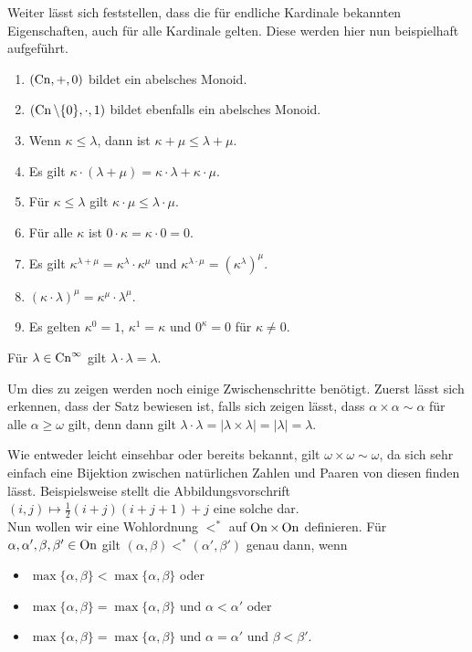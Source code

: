 Weiter lässt sich feststellen, dass die für endliche Kardinale bekannten Eigenschaften, auch für alle Kardinale gelten. Diese werden hier nun beispielhaft aufgeführt.

\begin{enumerate}
	\item $(\operatorname{Cn},+,0)$ bildet ein abelsches Monoid.
	\item $(\operatorname{Cn}\setminus \{0\},\cdot, 1)$ bildet ebenfalls ein abelsches Monoid.
	\item Wenn $\kappa\leq\lambda$, dann ist $\kappa+\mu \leq \lambda+\mu$.
	\item Es gilt $\kappa\cdot(\lambda+\mu)=\kappa\cdot\lambda + \kappa\cdot\mu$.
	\item Für $\kappa\leq\lambda$ gilt $\kappa\cdot\mu \leq \lambda\cdot \mu$.
	\item Für alle $\kappa$ ist $0\cdot\kappa=\kappa\cdot 0=0$.
	\item Es gilt $\kappa^{\lambda+\mu}=\kappa^\lambda\cdot\kappa^\mu$ und $\kappa^{\lambda\cdot\mu}=(\kappa^\lambda)^\mu$.
	\item $(\kappa\cdot\lambda)^\mu=\kappa^\mu\cdot\lambda^\mu$.
	\item Es gelten $\kappa^0=1$, $\kappa^1=\kappa$ und $0^\kappa=0$ für $\kappa\neq0$.
\end{enumerate}

\begin{satz}[Hessenberg, 1906]
	Für $\lambda\in \operatorname{Cn}^\infty$ gilt $\lambda\cdot\lambda=\lambda$.
\end{satz}
Um dies zu zeigen werden noch einige Zwischenschritte benötigt. Zuerst lässt sich erkennen, dass der Satz bewiesen ist, falls sich zeigen lässt, dass $\alpha\times\alpha\sim \alpha$ für alle $\alpha\geq\omega$ gilt, denn dann gilt $\lambda\cdot\lambda=\vert\lambda\times\lambda\vert=\vert\lambda\vert=\lambda$.

Wie entweder leicht einsehbar oder bereits bekannt, gilt $\omega\times\omega\sim\omega$, da sich sehr einfach eine Bijektion zwischen natürlichen Zahlen und Paaren von diesen finden lässt. Beispielsweise stellt die Abbildungsvorschrift $(i,j)\mapsto\frac{1}{2}(i+j)(i+j+1)+j$ eine solche dar.
\\

Nun wollen wir eine Wohlordnung $<^\ast$ auf $\operatorname{On}\times \operatorname{On}$ definieren. Für $\alpha,\alpha',\beta,\beta'\in \operatorname{On}$ gilt $(\alpha,\beta)<^\ast(\alpha',\beta')$ genau dann, wenn
\begin{itemize}
	\item $\max\{\alpha,\beta\}<\max\{\alpha,\beta\}$ oder
	\item $\max\{\alpha,\beta\}=\max\{\alpha,\beta\}$ und $\alpha<\alpha'$ oder
	\item $\max\{\alpha,\beta\}=\max\{\alpha,\beta\}$ und $\alpha=\alpha'$ und $\beta<\beta'$.
\end{itemize}

